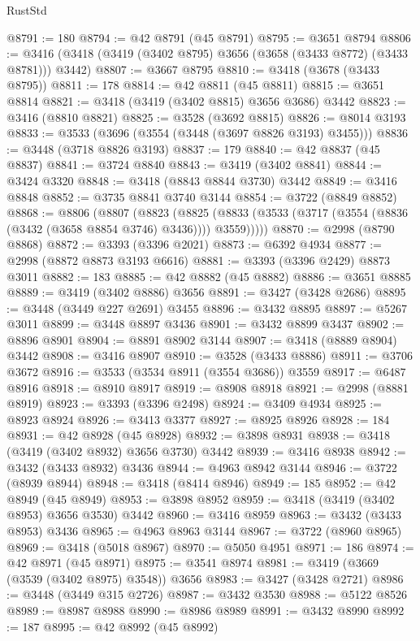 \begin{lexlean}{RustStd}
\begin{coremodule}
@8791 := 180
@8794 := @42 @8791 (@45 @8791)
@8795 := @3651 @8794
@8806 := @3416 (@3418 (@3419 (@3402 @8795) @3656 (@3658 (@3433 @8772) (@3433 @8781))) @3442)
@8807 := @3667 @8795
@8810 := @3418 (@3678 (@3433 @8795))
@8811 := 178
@8814 := @42 @8811 (@45 @8811)
@8815 := @3651 @8814
@8821 := @3418 (@3419 (@3402 @8815) @3656 @3686) @3442
@8823 := @3416 (@8810 @8821)
@8825 := @3528 (@3692 @8815)
@8826 := @8014 @3193
@8833 := @3533 (@3696 (@3554 (@3448 (@3697 @8826 @3193) @3455)))
@8836 := @3448 (@3718 @8826 @3193)
@8837 := 179
@8840 := @42 @8837 (@45 @8837)
@8841 := @3724 @8840
@8843 := @3419 (@3402 @8841)
@8844 := @3424 @3320
@8848 := @3418 (@8843 @8844 @3730) @3442
@8849 := @3416 @8848
@8852 := @3735 @8841 @3740 @3144
@8854 := @3722 (@8849 @8852)
@8868 := @8806
    (@8807
      (@8823
        (@8825 (@8833 (@3533 (@3717 (@3554 (@8836 (@3432 (@3658 @8854 @3746) @3436)))) @3559)))))
@8870 := @2998 (@8790 @8868)
@8872 := @3393 (@3396 @2021)
@8873 := @6392 @4934
@8877 := @2998 (@8872 @8873 @3193 @6616)
@8881 := @3393 (@3396 @2429) @8873 @3011
@8882 := 183
@8885 := @42 @8882 (@45 @8882)
@8886 := @3651 @8885
@8889 := @3419 (@3402 @8886) @3656
@8891 := @3427 (@3428 @2686)
@8895 := @3448 (@3449 @227 @2691) @3455
@8896 := @3432 @8895
@8897 := @5267 @3011
@8899 := @3448 @8897 @3436
@8901 := @3432 @8899 @3437
@8902 := @8896 @8901
@8904 := @8891 @8902 @3144
@8907 := @3418 (@8889 @8904) @3442
@8908 := @3416 @8907
@8910 := @3528 (@3433 @8886)
@8911 := @3706 @3672
@8916 := @3533 (@3534 @8911 (@3554 @3686)) @3559
@8917 := @6487 @8916
@8918 := @8910 @8917
@8919 := @8908 @8918
@8921 := @2998 (@8881 @8919)
@8923 := @3393 (@3396 @2498)
@8924 := @3409 @4934
@8925 := @8923 @8924
@8926 := @3413 @3377
@8927 := @8925 @8926
@8928 := 184
@8931 := @42 @8928 (@45 @8928)
@8932 := @3898 @8931
@8938 := @3418 (@3419 (@3402 @8932) @3656 @3730) @3442
@8939 := @3416 @8938
@8942 := @3432 (@3433 @8932) @3436
@8944 := @4963 @8942 @3144
@8946 := @3722 (@8939 @8944)
@8948 := @3418 (@8414 @8946)
@8949 := 185
@8952 := @42 @8949 (@45 @8949)
@8953 := @3898 @8952
@8959 := @3418 (@3419 (@3402 @8953) @3656 @3530) @3442
@8960 := @3416 @8959
@8963 := @3432 (@3433 @8953) @3436
@8965 := @4963 @8963 @3144
@8967 := @3722 (@8960 @8965)
@8969 := @3418 (@5018 @8967)
@8970 := @5050 @4951
@8971 := 186
@8974 := @42 @8971 (@45 @8971)
@8975 := @3541 @8974
@8981 := @3419 (@3669 (@3539 (@3402 @8975) @3548)) @3656
@8983 := @3427 (@3428 @2721)
@8986 := @3448 (@3449 @315 @2726)
@8987 := @3432 @3530
@8988 := @5122 @8526
@8989 := @8987 @8988
@8990 := @8986 @8989
@8991 := @3432 @8990
@8992 := 187
@8995 := @42 @8992 (@45 @8992)

\end{coremodule}
\end{lexlean}
